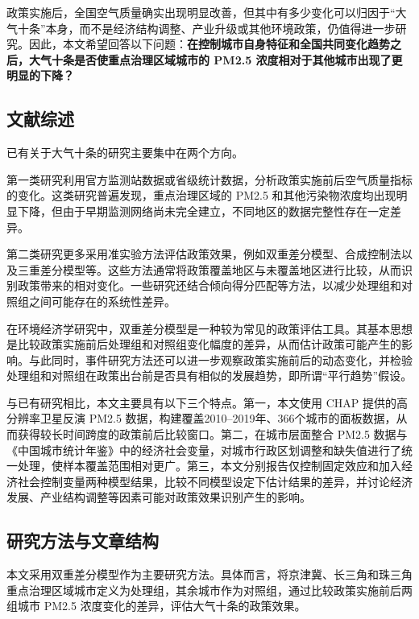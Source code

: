 \documentclass[12pt]{article}
\begin{document}
政策实施后，全国空气质量确实出现明显改善，但其中有多少变化可以归因于``大气十条''本身，而不是经济结构调整、产业升级或其他环境政策，仍值得进一步研究。因此，本文希望回答以下问题：\textbf{在控制城市自身特征和全国共同变化趋势之后，大气十条是否使重点治理区域城市的 PM2.5 浓度相对于其他城市出现了更明显的下降？}

\subsection{文献综述}

已有关于大气十条的研究主要集中在两个方向。

第一类研究利用官方监测站数据或省级统计数据，分析政策实施前后空气质量指标的变化\citep{chen2017appcap,zhang2019pm25}。这类研究普遍发现，重点治理区域的 PM2.5 和其他污染物浓度均出现明显下降，但由于早期监测网络尚未完全建立，不同地区的数据完整性存在一定差异。

第二类研究更多采用准实验方法评估政策效果，例如双重差分模型、合成控制法以及三重差分模型等\citep{greenstone2021appcap}。这些方法通常将政策覆盖地区与未覆盖地区进行比较，从而识别政策带来的相对变化。一些研究还结合倾向得分匹配等方法，以减少处理组和对照组之间可能存在的系统性差异。

在环境经济学研究中，双重差分模型是一种较为常见的政策评估工具\citep{angrist2009mostly,stock2003introduction}。其基本思想是比较政策实施前后处理组和对照组变化幅度的差异，从而估计政策可能产生的影响。与此同时，事件研究方法还可以进一步观察政策实施前后的动态变化，并检验处理组和对照组在政策出台前是否具有相似的发展趋势，即所谓``平行趋势''假设。

与已有研究相比，本文主要具有以下三个特点。第一，本文使用 CHAP 提供的高分辨率卫星反演 PM2.5 数据\citep{wei2021chap}，构建覆盖2010--2019年、366个城市的面板数据，从而获得较长时间跨度的政策前后比较窗口。第二，在城市层面整合 PM2.5 数据与《中国城市统计年鉴》中的经济社会变量，对城市行政区划调整和缺失值进行了统一处理，使样本覆盖范围相对更广。第三，本文分别报告仅控制固定效应和加入经济社会控制变量两种模型结果，比较不同模型设定下估计结果的差异，并讨论经济发展、产业结构调整等因素可能对政策效果识别产生的影响。

\subsection{研究方法与文章结构}

本文采用双重差分模型作为主要研究方法。具体而言，将京津冀、长三角和珠三角重点治理区域城市定义为处理组，其余城市作为对照组，通过比较政策实施前后两组城市 PM2.5 浓度变化的差异，评估大气十条的政策效果。
\end{document}
